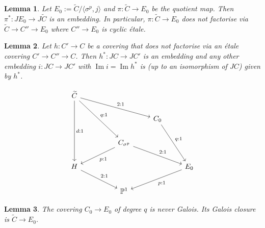 \documentclass[10pt,a4paper]{amsart}
\newtheorem{lem}{Lemma}
\DeclareMathOperator{\Image}{Im}
\newcommand{\tC}{{\widetilde C}}
\begin{document}
\begin{lem}\label{embeddingE}
Let $E_0 := \tC/\langle\sigma^p,j\rangle$ and $\pi: \tC \to E_0$ be the quotient map. Then $\pi^*:JE_0\to J\tC$ is an embedding. In particular, $\pi:\tC\to E_0$ does not factorise via $\tC\to C''\to E_0$ where $C''\to E_0$ is cyclic \'etale. 
\end{lem}

\begin{lem}\label{key_lemma}
    Let $h:C'\to C$ be a covering that does not factorise via an \'etale covering $C'\to C''\to C$.
        Then $h^*: JC\to JC'$ is an embedding and any other embedding $i:JC\to JC'$ with $\Image i=\Image h^*$ is (up to an isomorphism of $JC$) given by $h^*$.
\end{lem}

\begin{equation}
\label{small-tower}
\begin{tikzcd}
\tC \arrow[rrdd, "q:1"] \arrow[rrrd, "2:1"] \arrow[ddd, "d:1"] &  &                                                    &                        &                        \\
                                                                &  &                                                    & C_0 \arrow[rdd, "q:1"] &                        \\
                                                                &  & C_{\sigma^p} \arrow[lld, "p:1"] \arrow[rrd, "2:1"] &                        &                        \\
H \arrow[rrd, "2:1"]                                            &  &                                                    &                        & E_0 \arrow[lld, "p:1"] \\
                                                                &  & \mathbb{P}^1                                       &                        &                       
\end{tikzcd}
\end{equation}

\begin{lem}\label{elliptic2}
   The covering $C_0\to E_0$ of degree $q$ is never Galois. Its Galois closure is $\tC\to E_0$. 
\end{lem}
\end{document}

